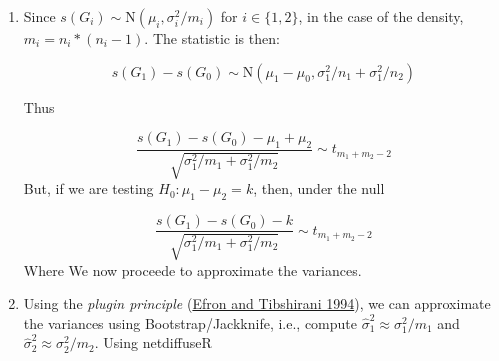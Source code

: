 \documentclass[
]{book}
\newenvironment{Shaded}{\begin{snugshade}}{\end{snugshade}}
\newcommand{\AttributeTok}[1]{\textcolor[rgb]{0.77,0.63,0.00}{#1}}
\newcommand{\CommentTok}[1]{\textcolor[rgb]{0.56,0.35,0.01}{\textit{#1}}}
\newcommand{\ControlFlowTok}[1]{\textcolor[rgb]{0.13,0.29,0.53}{\textbf{#1}}}
\newcommand{\DecValTok}[1]{\textcolor[rgb]{0.00,0.00,0.81}{#1}}
\newcommand{\FunctionTok}[1]{\textcolor[rgb]{0.00,0.00,0.00}{#1}}
\newcommand{\NormalTok}[1]{#1}
\newcommand{\OtherTok}[1]{\textcolor[rgb]{0.56,0.35,0.01}{#1}}
\newcommand{\SpecialCharTok}[1]{\textcolor[rgb]{0.00,0.00,0.00}{#1}}
\begin{document}
\begin{enumerate}
\def\labelenumi{\arabic{enumi}.}
\item
  Since \(s(G_i)\sim \mbox{N}(\mu_i,\sigma_i^2/m_i)\) for \(i\in\{1,2\}\), in the case
  of the density, \(m_i = n_i * (n_i - 1)\). The statistic is then:

  \[
  s(G_1) - s(G_0)\sim \mbox{N}(\mu_1-\mu_0, \sigma_1^2/n_1 + \sigma_1^2/n_2)
  \]

  Thus

  \[
  \frac{s(G_1) - s(G_0) - \mu_1 + \mu_2}{\sqrt{\sigma_1^2/{m_1} + \sigma_1^2/{m_2}}} \sim t_{m_1 + m_2 - 2}
  \]
  But, if we are testing \(H_0: \mu_1 - \mu_2 = k\), then, under the null

  \[
  \frac{s(G_1) - s(G_0) - k}{\sqrt{\sigma_1^2/{m_1} + \sigma_1^2/{m_2}}} \sim t_{m_1 + m_2 - 2}
  \]
  Where We now proceede to approximate the variances.
\item
  Using the \emph{plugin principle} (\protect\hyperlink{ref-Efron1994}{Efron and Tibshirani 1994}), we can approximate the variances
  using Bootstrap/Jackknife, i.e., compute \(\hat\sigma_1^2\approx\sigma_1^2/m_1\) and
  \(\hat\sigma_2^2\approx\sigma_2^2/m_2\). Using netdiffuseR

\begin{Shaded}
\end{Shaded}
\end{enumerate}
\end{document}
